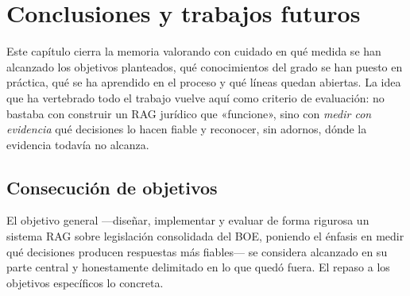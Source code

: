 \chapter{Conclusiones y trabajos futuros}
\label{chap:conclusiones}

Este capítulo cierra la memoria valorando con cuidado en qué medida se han alcanzado los objetivos planteados, qué conocimientos del grado se han puesto en práctica, qué se ha aprendido en el proceso y qué líneas quedan abiertas. La idea que ha vertebrado todo el trabajo vuelve aquí como criterio de evaluación: no bastaba con construir un RAG jurídico que «funcione», sino con \emph{medir con evidencia} qué decisiones lo hacen fiable y reconocer, sin adornos, dónde la evidencia todavía no alcanza.

\section{Consecución de objetivos}
\label{sec:consecucion-objetivos}

El objetivo general —diseñar, implementar y evaluar de forma rigurosa un sistema RAG sobre legislación consolidada del BOE, poniendo el énfasis en medir qué decisiones producen respuestas más fiables— se considera alcanzado en su parte central y honestamente delimitado en lo que quedó fuera. El repaso a los objetivos específicos lo concreta.

